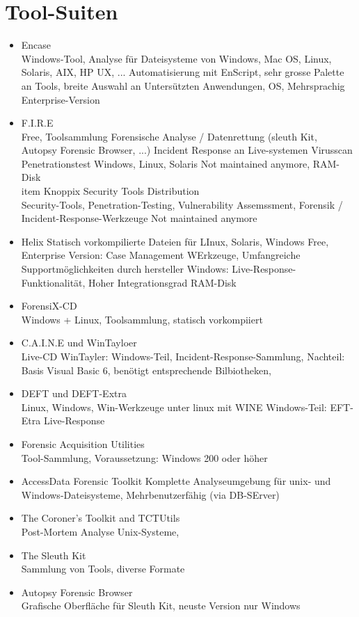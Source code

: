 \section{Tool-Suiten}
\begin{itemize}
\item Encase \\
Windows-Tool, Analyse für Dateisysteme von Windows, Mac OS, Linux, Solaris, AIX, HP UX, ...
Automatisierung mit EnScript, sehr grosse Palette an Tools, breite Auswahl an Untersützten Anwendungen, OS, Mehrsprachig
Enterprise-Version
\item F.I.R.E\\
Free, Toolsammlung
Forensische Analyse / Datenrettung (sleuth Kit, Autopsy Forensic Browser, ...)
Incident Response an Live-systemen
Virusscan
Penetrationstest
Windows, Linux, Solaris
Not maintained anymore,
RAM-Disk
\\item Knoppix Security Tools Distribution\\
Security-Tools, Penetration-Testing, Vulnerability Assemssment, Forensik / Incident-Response-Werkzeuge
Not maintained anymore
\item Helix
Statisch vorkompilierte Dateien für LInux, Solaris, Windows
Free, Enterprise Version: Case Management WErkzeuge, Umfangreiche Supportmöglichkeiten durch hersteller
Windows: Live-Response-Funktionalität, Hoher Integrationsgrad
RAM-Disk
\item ForensiX-CD\\
Windows + Linux, Toolsammlung, statisch vorkompiiert
\item C.A.I.N.E und WinTayloer \\
Live-CD
WinTayler: Windows-Teil, Incident-Response-Sammlung, Nachteil: Basis Visual Basic 6, benötigt entsprechende Bilbiotheken, 
\item DEFT und DEFT-Extra\\
Linux, Windows, Win-Werkzeuge unter linux mit WINE
Windows-Teil: EFT-Etra
Live-Response
\item Forensic Acquisition Utilities \\
Tool-Sammlung, Voraussetzung: Windows 200 oder höher
\item AccessData Forensic Toolkit
Komplette Analyseumgebung für unix- und Windows-Dateisysteme, Mehrbenutzerfähig (via DB-SErver)
\item The Coroner's Toolkit and TCTUtils\\
Post-Mortem Analyse Unix-Systeme, 
\item The Sleuth Kit\\
Sammlung von Tools, diverse Formate
\item Autopsy Forensic Browser\\
Grafische Oberfläche für Sleuth Kit, neuste Version nur Windows
\end{itemize}


